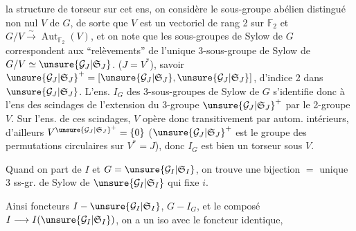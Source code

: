 la structure de torseur sur cet ens, on considère le sous-groupe abélien distingué
 non nul $V$ de $G$, de sorte que $V$ est un vectoriel
de rang 2 sur $\mathbb{F}_2$ et $G/V\xrightarrow{\sim}\operatorname{Aut}_{\mathbb{F}_2}(V)$,
et on note que les sous-groupes de Sylow de $G$ correspondent aux
``relèvements'' de l'unique 3-sous-groupe de Sylow de
$G/V\simeq\unsure{\mathcal{G}_J|\mathfrak{S}_J}$.
($J=V^*$), savoir
$\unsure{\mathcal{G}_J|\mathfrak{S}_J}^+=[\unsure{\mathcal{G}_J|\mathfrak{S}_J},\unsure{\mathcal{G}_J|\mathfrak{S}_J}]$,
d'indice 2 dans $\unsure{\mathcal{G}_J|\mathfrak{S}_J}$.
 L'ens. $I_G$ des 3-sous-groupes de Sylow de $G$
s'identifie donc à l'ens des scindages de l'extension
du 3-groupe $\unsure{\mathcal{G}_J|\mathfrak{S}_J}^+$ par le 2-groupe $V$.
Sur l'ens. de ces scindages, $V$ opère donc transitivement par autom. intérieurs,
d'ailleurs
$V^{\unsure{\mathcal{G}_J|\mathfrak{S}_J}^+}=\{0\}$
($\unsure{\mathcal{G}_J|\mathfrak{S}_J}^+$ est le groupe des permutations circulaires sur
$V^*=J$), donc $I_G$ est bien un torseur sous $V$.

Quand on part de $I$ et  $G=\unsure{\mathcal{G}_I|\mathfrak{S}_I}$,
on trouve une bijection
$=$ unique 3 ss-gr. de Sylow de $\unsure{\mathcal{G}_I|\mathfrak{S}_I}$ qui fixe $i$.

Ainsi  foncteurs
$I\mathbin{-}\unsure{\mathcal{G}_I|\mathfrak{S}_I}$,
$G\mathbin{-}I_G$, et le composé $I\longrightarrow I(\unsure{\mathcal{G}_I|\mathfrak{S}_I})$,
on a un iso avec le  foncteur identique,
